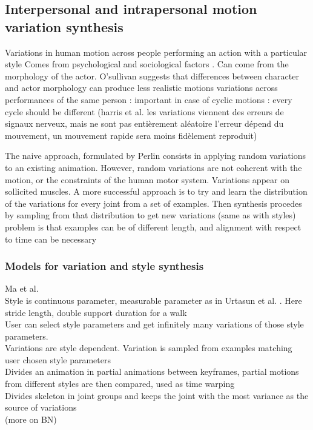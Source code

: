 \documentclass[11pt]{sdm}
\begin{document}
\subsection{Interpersonal and intrapersonal motion variation synthesis}

Variations in human motion across people performing an action with a particular style
Comes from psychological and sociological factors \cite{multon:tel-00441143}. Can come from the morphology of the actor.
O'sullivan \cite{o2009variety} suggests that differences between character and actor morphology can produce less realistic motions
variations across performances of the same person : important in case of cyclic motions : every cycle should be different
(harris et al. \cite{harris98} les variations viennent des erreurs de signaux nerveux, mais ne sont pas entièrement aléatoire
l'erreur dépend du mouvement, un mouvement rapide sera moins fidèlement reproduit)


The naive approach, formulated by Perlin \cite{perlin} consists in applying random variations to an existing animation. However, random variations are not coherent with the motion, or the constraints of the human motor system. 
Variations appear on sollicited muscles. 
A more successful approach is to try and learn the distribution of the variations for every joint from a set of examples. Then synthesis procedes by sampling from that distribution to get new variations
(same as with styles) problem is that examples can be of different length, and alignment with respect to time can be necessary

\subsubsection{Models for variation and style synthesis}
Ma et al. \cite{ma2010modeling}\\
Style is continuous parameter, measurable parameter as in Urtasun et al. \cite{urtasun2004style}. Here stride length, double support duration for a walk\\
User can select style parameters and get infinitely many variations of those style parameters.\\
Variations are style dependent. Variation is sampled from examples matching user chosen style parameters\\
Divides an animation in partial animations between keyframes, partial motions from different styles are then compared, used as time warping\\
Divides skeleton in joint groups and keeps the joint with the most variance as the source of variations\\
(more on BN)
\end{document}
